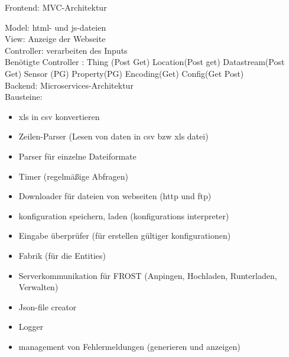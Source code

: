 Frontend: MVC-Architektur

Model: html- und js-dateien\\
View: Anzeige der Webseite\\
Controller: verarbeiten des Inputs\\
Benötigte Controller : Thing (Post Get) Location(Post get) Datastream(Post Get) Sensor (PG) Property(PG) Encoding(Get) Config(Get Post)\\
Backend: Microservices-Architektur
\ \\

Bausteine:
\begin{itemize}
\item xls in csv konvertieren
\item Zeilen-Parser (Lesen von daten in csv bzw xls datei)
\item Parser für einzelne Dateiformate
\item Timer (regelmäßige Abfragen)
\item Downloader für dateien von webseiten (http und ftp)
\item konfiguration speichern, laden (konfigurations interpreter)
\item Eingabe überprüfer (für erstellen gültiger konfigurationen)
\item Fabrik (für die Entities)
\item Serverkommunikation für FROST (Anpingen, Hochladen, Runterladen, Verwalten)
\item Json-file creator
\item Logger
\item management von Fehlermeldungen (generieren und anzeigen)

\end{itemize}